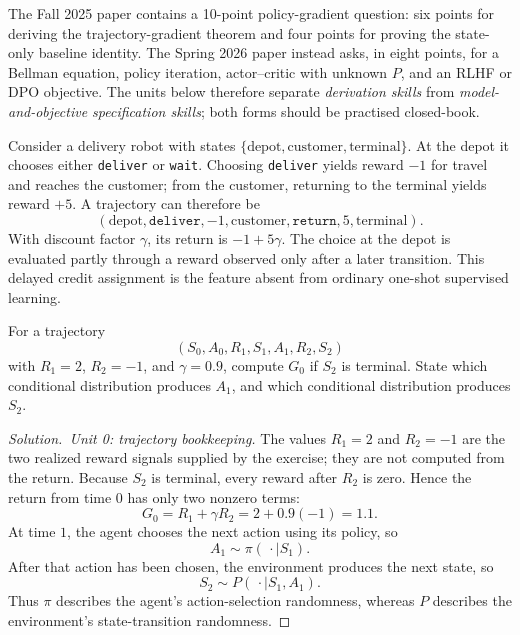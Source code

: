 \documentclass[11pt,a4paper]{article}
\theoremstyle{definition}
\newenvironment{solution}[1][]{\begin{proof}[Solution.\ #1]}{\end{proof}}
\begin{document}
\begin{note}
The Fall 2025 paper contains a 10-point policy-gradient question: six points for deriving
the trajectory-gradient theorem and four points for proving the state-only baseline identity.
The Spring 2026 paper instead asks, in eight points, for a Bellman equation, policy
iteration, actor--critic with unknown $P$, and an RLHF or DPO objective. The units below
therefore separate \emph{derivation skills} from \emph{model-and-objective specification
skills}; both forms should be practised closed-book.
\end{note}

\begin{example}
Consider a delivery robot with states $\{\text{depot},\text{customer},\text{terminal}\}$.
At the depot it chooses either \texttt{deliver} or \texttt{wait}. Choosing
\texttt{deliver} yields reward $-1$ for travel and reaches the customer; from the customer,
returning to the terminal yields reward $+5$. A trajectory can therefore be
\[
(\text{depot},\texttt{deliver},-1,\text{customer},
\texttt{return},5,\text{terminal}).
\]
With discount factor $\gamma$, its return is $-1+5\gamma$. The choice at the depot is
evaluated partly through a reward observed only after a later transition. This delayed
credit assignment is the feature absent from ordinary one-shot supervised learning.
\end{example}

\begin{exercise}
For a trajectory
\[
(S_0,A_0,R_1,S_1,A_1,R_2,S_2)
\]
with $R_1=2$, $R_2=-1$, and $\gamma=0.9$, compute $G_0$ if $S_2$ is terminal. State
which conditional distribution produces $A_1$, and which conditional distribution produces
$S_2$.
\end{exercise}

\begin{solution}[Unit 0: trajectory bookkeeping]
The values $R_1=2$ and $R_2=-1$ are the two realized reward signals supplied by the
exercise; they are not computed from the return. Because $S_2$ is terminal, every reward
after $R_2$ is zero. Hence the return from time $0$ has only two nonzero terms:
\[
G_0=R_1+\gamma R_2
=2+0.9(-1)=1.1.
\]
At time $1$, the agent chooses the next action using its policy, so
\[
A_1\sim\pi(\,\cdot\mid S_1).
\]
After that action has been chosen, the environment produces the next state, so
\[
S_2\sim P(\,\cdot\mid S_1,A_1).
\]
Thus $\pi$ describes the agent's action-selection randomness, whereas $P$ describes the
environment's state-transition randomness.
\end{solution}
\end{document}
